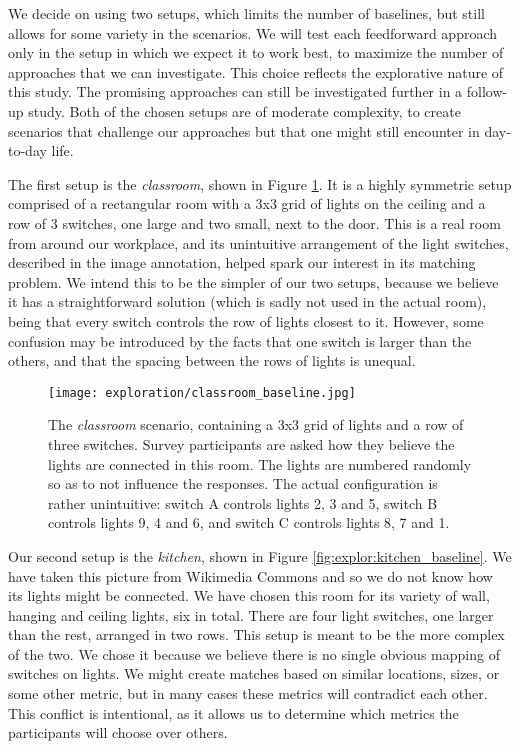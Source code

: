 We decide on using two setups, which limits the number of baselines, but still allows for some variety in the scenarios. We will test each feedforward approach only in the setup in which we expect it to work best, to maximize the number of approaches that we can investigate. This choice reflects the explorative nature of this study. The promising approaches can still be investigated further in a follow-up study. Both of the chosen setups are of moderate complexity, to create scenarios that challenge our approaches but that one might still encounter in day-to-day life.

The first setup is the \textit{classroom}, shown in Figure \ref{fig:explor:classroom_baseline}. It is a highly symmetric setup comprised of a rectangular room with a 3x3 grid of lights on the ceiling and a row of 3 switches, one large and two small, next to the door. This is a real room from around our workplace, and its unintuitive arrangement of the light switches, described in the image annotation, helped spark our interest in its matching problem. We intend this to be the simpler of our two setups, because we believe it has a straightforward solution (which is sadly not used in the actual room), being that every switch controls the row of lights closest to it. However, some confusion may be introduced by the facts that one switch is larger than the others, and that the spacing between the rows of lights is unequal.
    
\begin{figure}
    \centering
    \texttt{[image: exploration/classroom\_baseline.jpg]}
    \caption{The \textit{classroom} scenario, containing a 3x3 grid of lights and a row of three switches. Survey participants are asked how they believe the lights are connected in this room. The lights are numbered randomly so as to not influence the responses. The actual configuration is rather unintuitive: switch A controls lights 2, 3 and 5, switch B controls lights 9, 4 and 6, and switch C controls lights 8, 7 and 1.}
    \label{fig:explor:classroom_baseline}
\end{figure}

Our second setup is the \textit{kitchen}, shown in Figure \ref{fig:explor:kitchen_baseline}. We have taken this picture from Wikimedia Commons \cite{FileTROY82:online} and so we do not know how its lights might be connected. We have chosen this room for its variety of wall, hanging and ceiling lights, six in total. There are four light switches, one larger than the rest, arranged in two rows. This setup is meant to be the more complex of the two. We chose it because we believe there is no single obvious mapping of switches on lights. We might create matches based on similar locations, sizes, or some other metric, but in many cases these metrics will contradict each other. This conflict is intentional, as it allows us to determine which metrics the participants will choose over others.


